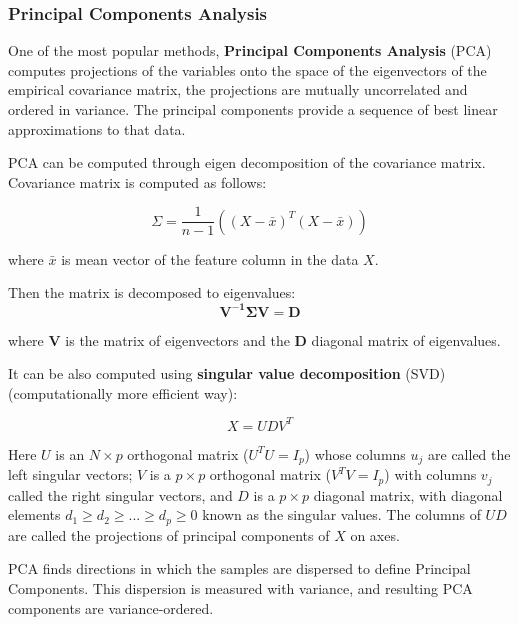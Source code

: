 \documentclass[12pt,]{book}
\theoremstyle{definition}
\theoremstyle{definition}
\theoremstyle{definition}
\theoremstyle{remark}
\begin{document}
\hypertarget{principal-components-analysis}{%
\subsubsection{Principal Components
Analysis}\label{principal-components-analysis}}

One of the most popular methods, \textbf{Principal Components Analysis}
(PCA) computes projections of the variables onto the space of the
eigenvectors of the empirical covariance matrix, the projections are
mutually uncorrelated and ordered in variance. The principal components
provide a sequence of best linear approximations to that data.

PCA can be computed through eigen decomposition of the covariance
matrix. Covariance matrix is computed as follows:

\begin{equation}
\Sigma = \frac{1}{n-1}((X-\bar{x})^T(X-\bar{x})) \label{eq:covPCA}
\end{equation}

where \(\bar{x}\) is mean vector of the feature column in the data
\(X\).

Then the matrix is decomposed to eigenvalues: \begin{equation}
\mathbf{V^{-1}\Sigma V=D} \label{eq:eigenvecPCA}
\end{equation}

where \(\mathbf{V}\) is the matrix of eigenvectors and the
\(\mathbf{D}\) diagonal matrix of eigenvalues.

It can be also computed using \textbf{singular value decomposition}
(SVD) (computationally more efficient way):

\begin{equation}
X= UDV^T \label{eq:svd}
\end{equation}

Here \(U\) is an \(N \times p\) orthogonal matrix (\(U^T U = I_p\))
whose columns \(u_j\) are called the left singular vectors; \(V\) is a
\(p \times p\) orthogonal matrix (\(V^T V = I_p\)) with columns \(v_j\)
called the right singular vectors, and \(D\) is a \(p \times p\)
diagonal matrix, with diagonal elements
\(d_1 \geq d_2 \geq ... \geq d_p \geq 0\) known as the singular values.
The columns of \(UD\) are called the projections of principal components
of \(X\) on axes.

PCA finds directions in which the samples are dispersed to define
Principal Components. This dispersion is measured with variance, and
resulting PCA components are variance-ordered.
\end{document}
